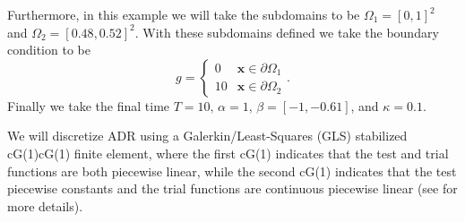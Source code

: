     Furthermore, in this example we will take the subdomains to be $\Omega_1 =
    [0,1]^2$ and $\Omega_2 = [0.48,0.52]^2$. With these subdomains defined we
    take the boundary condition to be
    \begin{equation}
        g = \begin{cases}
            0   &\mathbf{x} \in \partial \Omega_1 \\
            10  &\mathbf{x} \in \partial \Omega_2
        \end{cases}.
        \label{eq:ADRBCs}
    \end{equation}
    Finally we take the final time $T=10,\, \alpha=1,\, \beta = \left[ -1,
    -0.61 \right]$, and $\kappa = 0.1$.

    We will discretize ADR using a Galerkin\slash Least-Squares (GLS) stabilized
    cG(1)cG(1) finite element, where the first cG(1) indicates that the test and
    trial functions are both piecewise linear, while the second cG(1) indicates
    that the test piecewise constants and the trial functions are continuous
    piecewise linear (see \cite{Hoffman2006a} for more details).


